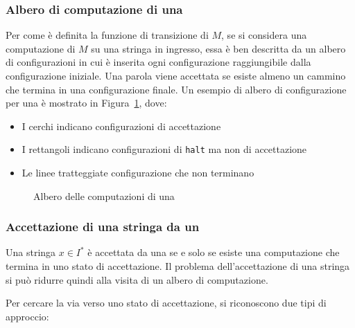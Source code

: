\documentclass[italian, 10pt]{article}
\begin{document}
\subsubsection{Albero di computazione di una \NTM}

Per come è definita la funzione di transizione di \(M\), se si considera una computazione di \(M\) su una stringa in ingresso, essa è ben descritta da un albero di configurazioni in cui è inserita ogni configurazione raggiungibile dalla configurazione iniziale.
Una parola viene accettata se esiste almeno un cammino che termina in una configurazione finale.
Un esempio di albero di configurazione per una \NTM è mostrato in Figura~\ref{fig:albero-configurazioni-NTM}, dove:

\begin{itemize}
  \item I cerchi indicano configurazioni di accettazione
  \item I rettangoli indicano configurazioni di \texttt{halt} ma non di accettazione
  \item Le linee tratteggiate configurazione che non terminano
\end{itemize}


\begin{figure}[htbp]
  \bigskip
  \centering
  \caption{Albero delle computazioni di una \NTM}
  \label{fig:albero-configurazioni-NTM}
  \bigskip
\end{figure}

\subsubsection{Accettazione di una stringa da un \NTM}

Una stringa \(x \in I^\ast\) è accettata da una \NTM se e solo se esiste una computazione che termina in uno stato di accettazione.
Il problema dell'accettazione di una stringa si pu\`o ridurre quindi alla visita di un albero di computazione.

Per cercare la via verso uno stato di accettazione, si riconoscono due tipi di approccio:
\end{document}
